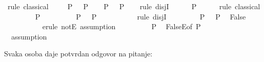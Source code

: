 \begin{isabellebody}
\begin{exercise}[subtitle=Pravilo ccontr i classical.]
\isadelimproof
%
\endisadelimproof
%
\isatagproof
{}\isamarkupfalse%
\ {\isacharparenleft}{\kern0pt}rule\ classical{\isacharparenright}{\kern0pt}\isanewline
\ \ \isamarkupfalse%
\ {\isachardoublequoteopen}{\isasymnot}\ {\isacharparenleft}{\kern0pt}P\ {\isasymor}\ {\isasymnot}\ P{\isacharparenright}{\kern0pt}{\isachardoublequoteclose}\isanewline
\ \ \isamarkupfalse%
\ {\isachardoublequoteopen}P\ {\isasymor}\ {\isasymnot}\ P{\isachardoublequoteclose}\isanewline
\ \ \isamarkupfalse%
\ {\isacharparenleft}{\kern0pt}rule\ disjI{}{\isacharparenright}{\kern0pt}\isanewline
\ \ \ \ \isamarkupfalse%
\ P\isanewline
\ \ \ \ \isamarkupfalse%
\ {\isacharparenleft}{\kern0pt}rule\ classical{\isacharparenright}{\kern0pt}\isanewline
\ \ \ \ \ \ \isamarkupfalse%
\ {\isachardoublequoteopen}{\isasymnot}\ P{\isachardoublequoteclose}\isanewline
\ \ \ \ \ \ \isamarkupfalse%
\ \isamarkupfalse%
\ {\isachardoublequoteopen}P\ {\isasymor}\ {\isasymnot}\ P{\isachardoublequoteclose}\ \isanewline
\ \ \ \ \ \ \ \ \isamarkupfalse%
\ {\isacharparenleft}{\kern0pt}rule\ disjI{}{\isacharparenright}{\kern0pt}\isanewline
\ \ \ \ \ \ \isamarkupfalse%
\ {\isacartoucheopen}{\isasymnot}\ {\isacharparenleft}{\kern0pt}P\ {\isasymor}\ {\isasymnot}\ P{\isacharparenright}{\kern0pt}{\isacartoucheclose}\ \isamarkupfalse%
\ False\ \isanewline
\ \ \ \ \ \ \ \ \isamarkupfalse%
\ {\isacharminus}{\kern0pt}\ {\isacharparenleft}{\kern0pt}erule\ notE{\isacharcomma}{\kern0pt}\ assumption{\isacharparenright}{\kern0pt}\isanewline
\ \ \ \ \ \ \isamarkupfalse%
\ \isamarkupfalse%
\ P\ \isamarkupfalse%
\ FalseE{\isacharbrackleft}{\kern0pt}of\ P{\isacharbrackright}{\kern0pt}\ \isanewline
\ \ \ \ \ \ \ \ \isamarkupfalse%
\ {\isacharminus}{\kern0pt}\ {\isacharparenleft}{\kern0pt}assumption{\isacharparenright}{\kern0pt}\isanewline
\ \ \ \ \isamarkupfalse%
\isanewline
\ \ \isamarkupfalse%
\isanewline
{}\isamarkupfalse%
%
\endisatagproof
{\isafoldproof}%
%
\isadelimproof
%
\endisadelimproof
%
\end{exercise}
%
\begin{exercise}[subtitle=Logčki lavirinti.]
%
\begin{isamarkuptext}%
Svaka osoba daje potvrdan odgovor na pitanje: %

\end{isamarkuptext}
\end{exercise}
\end{isabellebody}
